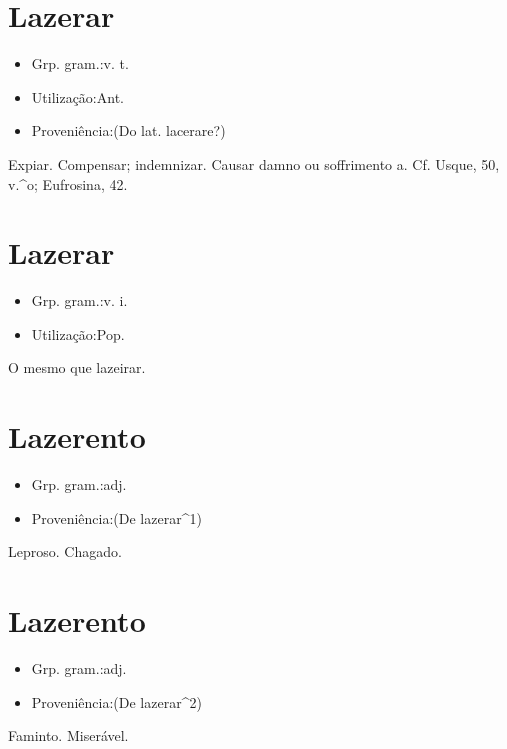 \section{Lazerar}
\begin{itemize}
\item {Grp. gram.:v. t.}
\end{itemize}
\begin{itemize}
\item {Utilização:Ant.}
\end{itemize}
\begin{itemize}
\item {Proveniência:(Do lat. \textunderscore lacerare\textunderscore ?)}
\end{itemize}
Expiar.
Compensar; indemnizar.
Causar damno ou soffrimento a. Cf. Usque, 50, v.^o; \textunderscore Eufrosina\textunderscore , 42.
\section{Lazerar}
\begin{itemize}
\item {Grp. gram.:v. i.}
\end{itemize}
\begin{itemize}
\item {Utilização:Pop.}
\end{itemize}
O mesmo que \textunderscore lazeirar\textunderscore .
\section{Lazerento}
\begin{itemize}
\item {Grp. gram.:adj.}
\end{itemize}
\begin{itemize}
\item {Proveniência:(De \textunderscore lazerar\textunderscore ^1)}
\end{itemize}
Leproso.
Chagado.
\section{Lazerento}
\begin{itemize}
\item {Grp. gram.:adj.}
\end{itemize}
\begin{itemize}
\item {Proveniência:(De \textunderscore lazerar\textunderscore ^2)}
\end{itemize}
Faminto.
Miserável.
